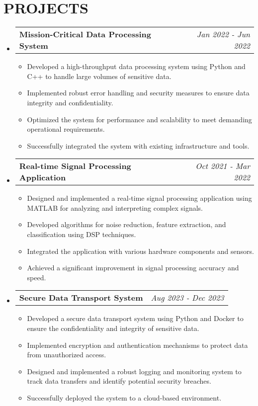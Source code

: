 \documentclass[letterpaper,11pt]{article}
\makeatletter
\newcommand{\resumeItem}[1]{\item\small{{#1 \vspace{-3pt}}}}
\newcommand{\resumeProjectHeading}[2]{\item\begin{tabular*}{0.97\textwidth}{l@{\extracolsep{\fill}}r}\small#1 & #2 \\ \end{tabular*}\vspace{-7pt}}
\newcommand{\resumeSubHeadingListStart}{\begin{itemize}[leftmargin=0.15in, label={}]}
\newcommand{\resumeSubHeadingListEnd}{\end{itemize}}
\newcommand{\resumeItemListStart}{\begin{itemize}}
\newcommand{\resumeItemListEnd}{\end{itemize}\vspace{-5pt}}
\makeatother
\begin{document}
\section{{\fontsize{9pt}{20pt}\selectfont \textbf{PROJECTS}}}\resumeSubHeadingListStart
\resumeProjectHeading{\textbf{Mission-Critical Data Processing System}}{\textit{Jan 2022 - Jun 2022}}
\resumeItemListStart
\resumeItem{Developed a high-throughput data processing system using Python and C++ to handle large volumes of sensitive data.}
\resumeItem{Implemented robust error handling and security measures to ensure data integrity and confidentiality.}
\resumeItem{Optimized the system for performance and scalability to meet demanding operational requirements.}
\resumeItem{Successfully integrated the system with existing infrastructure and tools.}
\resumeItemListEnd\vspace{-6pt}
\resumeProjectHeading{\textbf{Real-time Signal Processing Application}}{\textit{Oct 2021 - Mar 2022}}
\resumeItemListStart
\resumeItem{Designed and implemented a real-time signal processing application using MATLAB for analyzing and interpreting complex signals.}
\resumeItem{Developed algorithms for noise reduction, feature extraction, and classification using DSP techniques.}
\resumeItem{Integrated the application with various hardware components and sensors.}
\resumeItem{Achieved a significant improvement in signal processing accuracy and speed.}
\resumeItemListEnd\vspace{-6pt}
\resumeProjectHeading{\textbf{Secure Data Transport System}}{\textit{Aug 2023 - Dec 2023}}
\resumeItemListStart
\resumeItem{Developed a secure data transport system using Python and Docker to ensure the confidentiality and integrity of sensitive data.}
\resumeItem{Implemented encryption and authentication mechanisms to protect data from unauthorized access.}
\resumeItem{Designed and implemented a robust logging and monitoring system to track data transfers and identify potential security breaches.}
\resumeItem{Successfully deployed the system to a cloud-based environment.}
\resumeItemListEnd
\resumeSubHeadingListEnd\vspace{-17pt}
\end{document}
